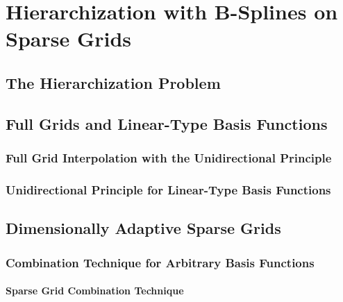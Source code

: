 
\chapter{Hierarchization with B-Splines on Sparse Grids}


\section{The Hierarchization Problem}


\section{Full Grids and Linear-Type Basis Functions}


\subsection{Full Grid Interpolation with the Unidirectional Principle}


\subsection{Unidirectional Principle for Linear-Type Basis Functions}


\section{Dimensionally Adaptive Sparse Grids}


\subsection{Combination Technique for Arbitrary Basis Functions}


\subsubsection{Sparse Grid Combination Technique}

